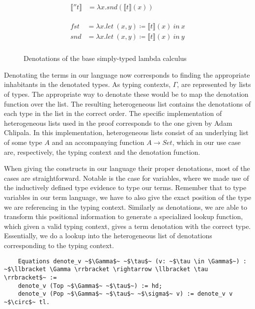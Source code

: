 \begin{figure}
\begin{gather*}
\begin{aligned}
        \llbracket \second{t} \rrbracket &=
          \lambda x. snd(\llbracket t \rrbracket(x)) \\
      \end{aligned} \\ \\
      \begin{aligned}
        fst &=
          \lambda x. let\ (x, y) \coloneqq \llbracket t \rrbracket(x)\ in\ x \\
        snd &=
          \lambda x. let\ (x, y) \coloneqq \llbracket t \rrbracket(x)\ in\ y \\
      \end{aligned}
    \end{gather*}
    \caption{Denotations of the base simply-typed lambda calculus}
    \label{eqn:denotation_base}
  \end{figure}

  Denotating the terms in our language now corresponds to finding the appropriate inhabitants in the denotated types.
  As typing contexts, $\Gamma$, are represented by lists of types.
  The appropriate way to denotate these would be to map the denotation function over the list.
  The resulting heterogeneous list contains the denotations of each type in the list in the correct order.
  The specific implementation of heterogeneous lists used in the proof corresponds to the one given by Adam Chlipala\cite{ChlipalaCPDT}.
  In this implementation, heterogeneous lists consist of an underlying list of some type $A$ and an accompanying function $A \to Set$, which in our use case are, respectively, the typing context and the denotation function.

  When giving the constructs in our language their proper denotations, most of the cases are straightforward.
  Notable is the case for variables, where we made use of the inductively defined type evidence to type our terms.
  Remember that to type variables in our term language, we have to also give the exact position of the type we are referencing in the typing context.
  Similarly as denotations, we are able to transform this positional information to generate a specialized lookup function, which given a valid typing context, gives a term denotation with the correct type.
  Essentially, we do a lookup into the heterogeneous list of denotations corresponding to the typing context.

  \begin{verbatim}
    Equations denote_v ~$\Gamma$~ ~$\tau$~ (v: ~$\tau \in \Gamma$~) : ~$\llbracket \Gamma \rrbracket \rightarrow \llbracket \tau \rrbracket$~ :=
    denote_v (Top ~$\Gamma$~ ~$\tau$~) := hd;
    denote_v (Pop ~$\Gamma$~ ~$\tau$~ ~$\sigma$~ v) := denote_v v ~$\circ$~ tl.
  \end{verbatim}

